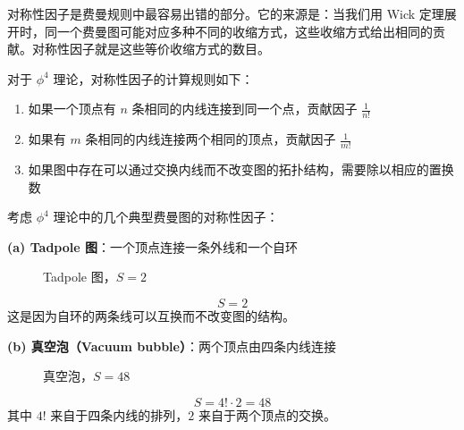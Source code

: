 对称性因子是费曼规则中最容易出错的部分。它的来源是：当我们用 Wick 定理展开时，同一个费曼图可能对应多种不同的收缩方式，这些收缩方式给出相同的贡献。对称性因子就是这些等价收缩方式的数目。

对于 $\phi^4$ 理论，对称性因子的计算规则如下：
\begin{enumerate}
    \item 如果一个顶点有 $n$ 条相同的内线连接到同一个点，贡献因子 $\frac{1}{n!}$
    \item 如果有 $m$ 条相同的内线连接两个相同的顶点，贡献因子 $\frac{1}{m!}$
    \item 如果图中存在可以通过交换内线而不改变图的拓扑结构，需要除以相应的置换数
\end{enumerate}

\begin{example}[对称性因子的计算]
    考虑 $\phi^4$ 理论中的几个典型费曼图的对称性因子：
    
    \textbf{(a) Tadpole 图}：一个顶点连接一条外线和一个自环
    \begin{figure}[htbp]
        \centering
        \caption{Tadpole 图，$S=2$}
    \end{figure}
    \begin{equation*}
        S = 2
    \end{equation*}
    这是因为自环的两条线可以互换而不改变图的结构。

    \textbf{(b) 真空泡（Vacuum bubble）}：两个顶点由四条内线连接
    \begin{figure}[htbp]
        \centering
        \caption{真空泡，$S=48$}
    \end{figure}
    \begin{equation*}
        S = 4! \cdot 2 = 48
    \end{equation*}
    其中 $4!$ 来自于四条内线的排列，$2$ 来自于两个顶点的交换。


\end{example}
